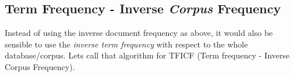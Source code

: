 %
%	
%	
%
%
%


\subsection{Term Frequency - Inverse \emph{Corpus} Frequency}
Instead of using the inverse document frequency as above, it would also be sensible to use the \emph{inverse term frequency} with respect to the whole database/corpus. Lets call that algorithm for TFICF (Term frequency - Inverse Corpus Frequency).
    
